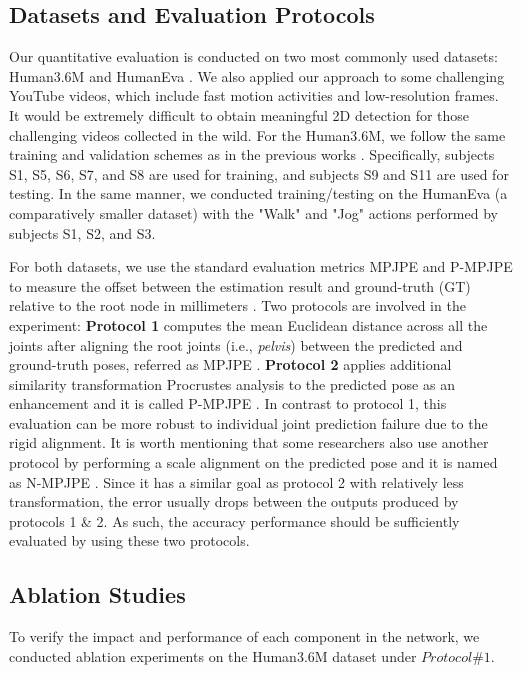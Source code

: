 \documentclass[twocolumn]{svjour3}          \smartqed  \usepackage{graphicx}
\begin{document}
\subsection{Datasets and Evaluation Protocols}
Our quantitative evaluation is conducted on two most commonly used datasets: Human3.6M \citep{Ionescu2014} and HumanEva \citep{Sigal2010}. We also applied our approach to some challenging YouTube videos, which include fast motion activities and low-resolution frames. It would be extremely difficult to obtain meaningful 2D detection for those challenging videos collected in the wild. For the Human3.6M, we follow the same training and validation schemes as in the previous works \citep{Martinez2017, Yang2018, Hossain2018, Pavllo2019}. Specifically, subjects S1, S5, S6, S7, and S8 are used for training, and subjects S9 and S11 are used for testing. In the same manner, we conducted training/testing on the HumanEva (a comparatively smaller dataset) with the "Walk" and "Jog" actions performed by subjects S1, S2, and S3.

For both datasets, we use the standard evaluation metrics MPJPE and P-MPJPE to measure the offset between the estimation result and ground-truth (GT) relative to the root node in millimeters \citep{Ionescu2014}. Two protocols are involved in the experiment: {\bf Protocol 1}  computes the mean Euclidean distance across all the joints after aligning the root joints (i.e., \emph{pelvis}) between the predicted and ground-truth poses, referred as MPJPE \citep{fang2018, lee2018, Pavlakos2017, luvizon20182d}.  {\bf Protocol 2} applies additional similarity transformation Procrustes analysis \citep{lepetit2005monocular} to the predicted pose as an enhancement and it is called P-MPJPE \citep{Martinez2017, Hossain2018, Yang2018, Pavllo2019}. In contrast to protocol 1, this evaluation can be more robust to individual joint prediction failure due to the rigid alignment. It is worth mentioning that some researchers also use another protocol by performing a scale alignment on the predicted pose and it is named as N-MPJPE \citep{rhodin2018learning}. Since it has a similar goal as protocol 2 with relatively less transformation, the error usually drops between the outputs produced by protocols 1 \& 2. As such, the accuracy performance should be sufficiently evaluated by using these two protocols.

\subsection{Ablation Studies}\label{ablation_study}
To verify the impact and performance of each component in the network, we conducted ablation experiments on the Human3.6M dataset under $Protocol \#1$. 
\end{document}
